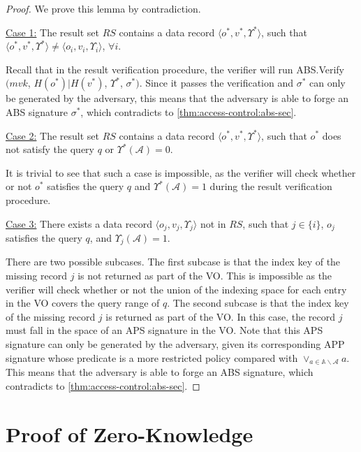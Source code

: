 \begin{proof}
  We prove this lemma by contradiction.

  \noindent\underline{Case 1:} The result set $RS$ contains a data record $\langle o^*, v^*, \Upsilon^*\rangle$, such that $\langle o^*, v^*, \Upsilon^*\rangle \neq \langle o_i, v_i, \Upsilon_i\rangle$, $\forall i$.

  Recall that in the result verification procedure, the verifier will run \textsf{ABS.Verify}$(mvk$, $H(o^*)|H(v^*)$, $\Upsilon^*$, $\sigma^*)$. Since it passes the verification and $\sigma^*$ can only be generated by the adversary, this means that the adversary is able to forge an ABS signature $\sigma^*$, which contradicts to \cref{thm:access-control:abs-sec}.

  \noindent\underline{Case 2:} The result set $RS$ contains a data record $\langle o^*, v^*, \Upsilon^*\rangle$, such that $o^*$ does not satisfy the query $q$ or $\Upsilon^*(\mathcal{A}) = 0$.

  It is trivial to see that such a case is impossible, as the verifier will check whether or not $o^*$ satisfies the query $q$ and $\Upsilon^*(\mathcal{A}) = 1$ during the result verification procedure.

  \noindent\underline{Case 3:} There exists a data record $\langle o_j, v_j, \Upsilon_j\rangle$ not in $RS$, such that $j \in \{i\}$, $o_j$ satisfies the query $q$, and $\Upsilon_j(\mathcal{A})= 1$.

  There are two possible subcases. The first subcase is that the index key of the missing record $j$ is not returned as part of the VO\@. This is impossible as the verifier will check whether or not the union of the indexing space for each entry in the VO covers the query range of $q$. The second subcase is that the index key of the missing record $j$ is returned as part of the VO\@. In this case, the record $j$ must fall in the space of an APS signature in the VO\@. Note that this APS signature can only be generated by the adversary, given its corresponding APP signature whose predicate is a more restricted policy compared with $\lor_{a \in \mathbb{A}\backslash\mathcal{A}} a$.
  This means that the adversary is able to forge an ABS signature,
  which contradicts to \cref{thm:access-control:abs-sec}.
\end{proof}

\section{Proof of Zero-Knowledge}

